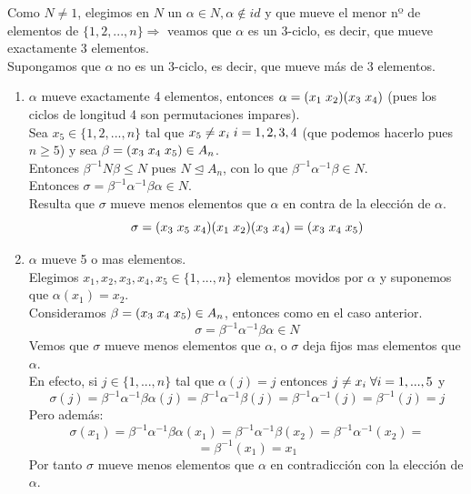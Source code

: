 \documentclass[11pt,a4paper]{article}
\begin{document}
Como $N \neq 1$, elegimos en $N$ un $\alpha \in N, \alpha \notin id$ y que mueve el menor nº de elementos de $\{1, 2, ..., n\} \Rightarrow$ veamos que $\alpha$ es un 3-ciclo, es decir, que mueve exactamente 3 elementos. \\
Supongamos que $\alpha$ no es un 3-ciclo, es decir, que mueve más de 3 elementos.
\begin{enumerate}[label = Caso \arabic*:]
\item $\alpha$ mueve exactamente 4 elementos, entonces $\alpha = (x_{1} \hspace{0.1cm} x_{2})(x_{3} \hspace{0.1cm} x_{4})$ (pues los ciclos de longitud 4 son permutaciones impares). \\
Sea $x_{5} \in \{1, 2, ..., n\}$ tal que $x_{5} \neq x_{i} \hspace{0.1cm} i = 1, 2, 3, 4$ (que podemos hacerlo pues $n \geq 5$) y sea $\beta = (x_{3} \hspace{0.1cm} x_{4} \hspace{0.1cm} x_{5}) \in A_{n}$. \\
Entonces $\beta^{-1}N\beta \leqslant N$ pues $N \unlhd A_{n}$, con lo que $\beta^{-1} \alpha^{-1} \beta \in N$. \\
Entonces $\sigma = \beta^{-1}\alpha^{-1}\beta\alpha \in N$. \\
Resulta que $\sigma$ mueve menos elementos que $\alpha$ en contra de la elección de $\alpha$.
$$\sigma = (x_{3} \hspace{0.1cm} x_{5} \hspace{0.1cm} x_{4}) (x_{1} \hspace{0.1cm} x_{2}) (x_{3} \hspace{0.1cm} x_{4}) = (x_{3} \hspace{0.1cm} x_{4} \hspace{0.1cm} x_{5})$$
\item $\alpha$ mueve 5 o mas elementos. \\
Elegimos $x_{1}, x_{2}, x_{3}, x_{4}, x_{5} \in \{1, ..., n\}$ elementos movidos por $\alpha$ y suponemos que $\alpha(x_{1}) = x_{2}$. \\
Consideramos $\beta = (x_{3} \hspace{0.1cm} x_{4} \hspace{0.1cm} x_{5}) \in A_{n}$, entonces como en el caso anterior.
$$\sigma = \beta^{-1} \alpha^{-1} \beta \alpha \in N$$
Vemos que $\sigma$ mueve menos elementos que $\alpha$, o $\sigma$ deja fijos mas elementos que $\alpha$. \\
En efecto, si $j \in \{1, ..., n\}$ tal que $\alpha(j) = j$ entonces $j \neq x_{i} \hspace{0.1cm} \forall i = 1, ..., 5$ y
$$\sigma(j) = \beta^{-1} \alpha^{-1} \beta \alpha (j) = \beta^{-1} \alpha^{-1} \beta (j) = \beta^{-1} \alpha^{-1} (j) = \beta^{-1}(j) = j$$
Pero además:
$$\sigma(x_{1}) = \beta^{-1} \alpha^{-1} \beta \alpha (x_{1}) = \beta^{-1} \alpha^{-1} \beta(x_{2}) = \beta^{-1} \alpha^{-1} (x_{2}) =$$ $$= \beta^{-1} (x_{1}) = x_{1}$$
Por tanto $\sigma$ mueve menos elementos que $\alpha$ en contradicción con la elección de $\alpha$.
\end{enumerate}
\end{document}
